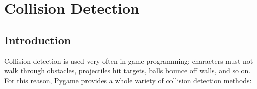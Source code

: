 \newpage
\section{Collision Detection}
\subsection{Introduction}
Collision detection is used very often in game programming: characters must not walk through obstacles, projectiles hit targets, balls bounce off walls, and so on. For this reason, Pygame provides a whole variety of collision detection methods:


